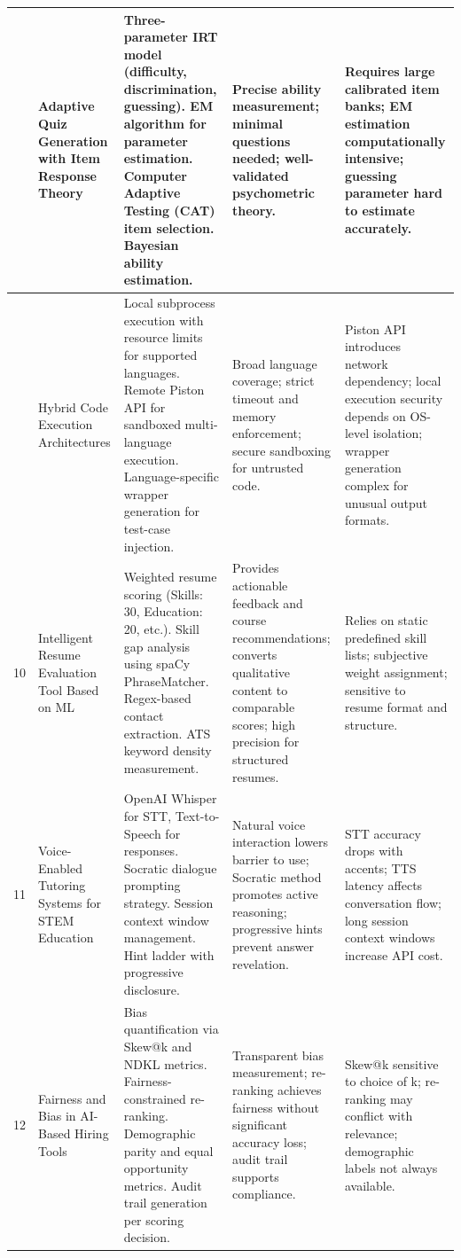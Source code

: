 \documentclass[12pt,a4paper]{report}
\begin{document}
\begin{longtable}{|>{\centering\arraybackslash}p{0.6cm}|p{3.1cm}|p{3.6cm}|p{3.2cm}|p{3.2cm}|}
8 & Adaptive Quiz Generation with Item Response Theory \cite{ref8} &
Three-parameter IRT model (difficulty, discrimination, guessing). EM algorithm for parameter estimation. Computer Adaptive Testing (CAT) item selection. Bayesian ability estimation. &
Precise ability measurement; minimal questions needed; well-validated psychometric theory. &
Requires large calibrated item banks; EM estimation computationally intensive; guessing parameter hard to estimate accurately. \\
\hline

9 & Hybrid Code Execution Architectures \cite{ref9} &
Local subprocess execution with resource limits for supported languages. Remote Piston API for sandboxed multi-language execution. Language-specific wrapper generation for test-case injection. &
Broad language coverage; strict timeout and memory enforcement; secure sandboxing for untrusted code. &
Piston API introduces network dependency; local execution security depends on OS-level isolation; wrapper generation complex for unusual output formats. \\
\hline

10 & Intelligent Resume Evaluation Tool Based on ML \cite{ref10} &
Weighted resume scoring (Skills: 30, Education: 20, etc.). Skill gap analysis using spaCy PhraseMatcher. Regex-based contact extraction. ATS keyword density measurement. &
Provides actionable feedback and course recommendations; converts qualitative content to comparable scores; high precision for structured resumes. &
Relies on static predefined skill lists; subjective weight assignment; sensitive to resume format and structure. \\
\hline

11 & Voice-Enabled Tutoring Systems for STEM Education \cite{ref11} &
OpenAI Whisper for STT, Text-to-Speech for responses. Socratic dialogue prompting strategy. Session context window management. Hint ladder with progressive disclosure. &
Natural voice interaction lowers barrier to use; Socratic method promotes active reasoning; progressive hints prevent answer revelation. &
STT accuracy drops with accents; TTS latency affects conversation flow; long session context windows increase API cost. \\
\hline

12 & Fairness and Bias in AI-Based Hiring Tools \cite{ref12} &
Bias quantification via Skew@k and NDKL metrics. Fairness-constrained re-ranking. Demographic parity and equal opportunity metrics. Audit trail generation per scoring decision. &
Transparent bias measurement; re-ranking achieves fairness without significant accuracy loss; audit trail supports compliance. &
Skew@k sensitive to choice of k; re-ranking may conflict with relevance; demographic labels not always available. \\
\hline


\end{longtable}
\end{document}
